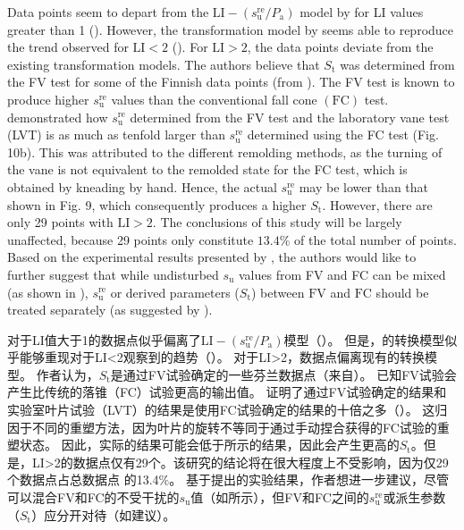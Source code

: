 \begin{ParaColumn}
    Data points seem to depart from the $\mathrm{LI}-\left(s_{\mathrm{u}}^{\mathrm{re}} / P_{\mathrm{a}}\right)$ model by \citet{Wroth1978137} for LI values greater than 1 (). However, the transformation model by \citet{Locat1988799} seems able to reproduce the trend observed for $\mathrm{LI}<2$ (). For $\mathrm{LI}>2$, the data points deviate from the existing transformation models. The authors believe that $S_{\mathrm{t}}$ was determined from the FV test for some of the Finnish data points (from \citet{Gardemeister1973113}). The FV test is known to produce higher $s_{\mathrm{u}}^{\mathrm{re}}$ values than the conventional fall cone $(\mathrm{FC})$ test. \citet{Tanaka2012590} demonstrated how $s_{\mathrm{u}}^{\mathrm{re}}$ determined from the FV test and the laboratory vane test (LVT) is as much as tenfold larger than $s_{\mathrm{u}}^{\mathrm{re}}$ determined using the FC test (Fig. 10b). This was attributed to the different remolding methods, as the turning of the vane is not equivalent to the remolded state for the FC test, which is obtained by kneading by hand. Hence, the actual $s_{\mathrm{u}}^{\mathrm{re}}$ may be lower than that shown in Fig. 9, which consequently produces a higher $S_{\mathrm{t}}$.  However, there are only 29 points with $\mathrm{LI}>2$.  The conclusions of this study will be largely unaffected, because 29 points only constitute $13.4\%$ of the total number of points. Based on the experimental results presented by \citet{Tanaka2012590}, the authors would like to further suggest that while undisturbed $s_{\mathrm{u}}$ values from FV and FC can be mixed (as shown in  ), $s_{\mathrm{u}}^{\mathrm{re}}$ or derived parameters ($S_{\mathrm{t}}$) between $\mathrm{FV}$ and $\mathrm{FC}$ should be treated separately (as suggested by  ).

    \switchcolumn

    \citet{Wroth1978137}对于LI值大于1的数据点似乎偏离了$\mathrm{LI}-\left(s_{\mathrm{u}}^{\mathrm{re}} / P_{\mathrm{a}}\right)$模型（）。 但是，\citet{Locat1988799}的转换模型似乎能够重现对于LI<2观察到的趋势（）。 对于LI>2，数据点偏离现有的转换模型。 作者认为，$S_{\mathrm{t}}$是通过FV试验确定的一些芬兰数据点（来自\citet{Gardemeister1973113}）。 已知FV试验会产生比传统的落锥（FC）试验更高的输出值。 \citet{Tanaka2012590}证明了通过FV试验确定的结果和实验室叶片试验（LVT）的结果是使用FC试验确定的结果的十倍之多（）。 这归因于不同的重塑方法，因为叶片的旋转不等同于通过手动捏合获得的FC试验的重塑状态。 因此，实际的结果可能会低于所示的结果，因此会产生更高的$S_{\mathrm{t}}$。但是，LI>2的数据点仅有29个。该研究的结论将在很大程度上不受影响，因为仅29个数据点占总数据点 的13.4$\%$。 基于\citet{Tanaka2012590}提出的实验结果，作者想进一步建议，尽管可以混合FV和FC的不受干扰的$s_{\mathrm{u}}$值（如所示），但FV和FC之间的$s_{\mathrm{u}}^{\mathrm{re}}$或派生参数（$S_{\mathrm{t}}$）应分开对待（如建议）。


\end{ParaColumn}
